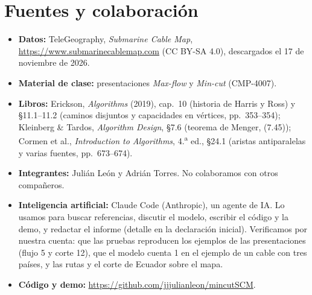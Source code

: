 \documentclass[11pt,a4paper]{article}
\begin{document}
\newpage
\section*{Fuentes y colaboración}
\begin{itemize}
  \item \textbf{Datos:} TeleGeography, \emph{Submarine Cable Map}, \url{https://www.submarinecablemap.com} (CC BY-SA 4.0), descargados el 17 de noviembre de 2026.
  \item \textbf{Material de clase:} presentaciones \emph{Max-flow} y \emph{Min-cut} (CMP-4007).
  \item \textbf{Libros:} Erickson, \emph{Algorithms} (2019), cap.~10 (historia de Harris y Ross) y §11.1--11.2 (caminos disjuntos y capacidades en vértices, pp.~353--354); Kleinberg \& Tardos, \emph{Algorithm Design}, §7.6 (teorema de Menger, (7.45)); Cormen et al., \emph{Introduction to Algorithms}, 4.\textsuperscript{a} ed., §24.1 (aristas antiparalelas y varias fuentes, pp.~673--674).
  \item \textbf{Integrantes:} Julián León y Adrián Torres. No colaboramos con otros compañeros.
  \item \textbf{Inteligencia artificial:} Claude Code (Anthropic), un agente de IA. Lo usamos para buscar referencias, discutir el modelo, escribir el código y la demo, y redactar el informe (detalle en la declaración inicial). Verificamos por nuestra cuenta: que las pruebas reproducen los ejemplos de las presentaciones (flujo 5 y corte 12), que el modelo cuenta 1 en el ejemplo de un cable con tres países, y las rutas y el corte de Ecuador sobre el mapa.
  \item \textbf{Código y demo:} \url{https://github.com/jjjulianleon/mincutSCM}.
\end{itemize}
\end{document}
